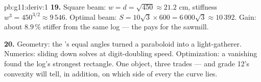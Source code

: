 \begin{solution}{pb:g11:deriv:1}
\textbf{19.} Square beam: $w = d = \sqrt{450} \approx 21.2$
cm, stiffness $w^3 = 450^{3/2} \approx 9\,546$. Optimal beam:
$S = 10\sqrt3 \times 600 = 6\,000\sqrt3 \approx 10\,392$. Gain:
about $8.9\,\%$ stiffer from the same log --- the 
pays for the sawmill.

\textbf{20.} Geometry: the 's equal angles turned a
paraboloid into a light-gatherer. Numerics: sliding down
 solves  at digit-doubling speed.
Optimization: a vanishing  found the log's strongest
rectangle. One object, three trades --- and grade 12's
convexity will tell, in addition, on which side of every
 the curve lies.
\end{solution}
